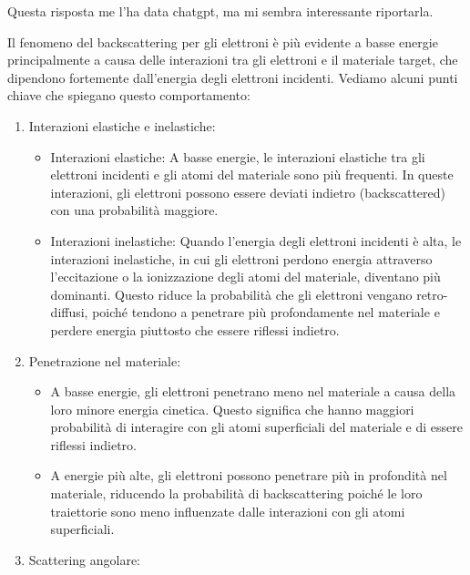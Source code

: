 \begin{approfondimento}
    \footnotesize Questa risposta me l'ha data chatgpt, ma mi sembra interessante riportarla.

    \vspace{0.2cm}Il fenomeno del backscattering per gli elettroni è più evidente a basse energie principalmente a causa delle interazioni tra gli elettroni e il materiale target, che dipendono fortemente dall'energia degli elettroni incidenti. Vediamo alcuni punti chiave che spiegano questo comportamento:

    \begin{enumerate}[leftmargin=0.6cm]
        \item Interazioni elastiche e inelastiche:
        \begin{itemize}[leftmargin=0pt]
            \item Interazioni elastiche: A basse energie, le interazioni elastiche tra gli elettroni incidenti e gli atomi del materiale sono più frequenti. In queste interazioni, gli elettroni possono essere deviati indietro (backscattered) con una probabilità maggiore.
            \item Interazioni inelastiche: Quando l'energia degli elettroni incidenti è alta, le interazioni inelastiche, in cui gli elettroni perdono energia attraverso l'eccitazione o la ionizzazione degli atomi del materiale, diventano più dominanti. Questo riduce la probabilità che gli elettroni vengano retro-diffusi, poiché tendono a penetrare più profondamente nel materiale e perdere energia piuttosto che essere riflessi indietro.
        \end{itemize}
        \item Penetrazione nel materiale:
        \begin{itemize}[leftmargin=0pt]
            \item A basse energie, gli elettroni penetrano meno nel materiale a causa della loro minore energia cinetica. Questo significa che hanno maggiori probabilità di interagire con gli atomi superficiali del materiale e di essere riflessi indietro.
            \item A energie più alte, gli elettroni possono penetrare più in profondità nel materiale, riducendo la probabilità di backscattering poiché le loro traiettorie sono meno influenzate dalle interazioni con gli atomi superficiali.
        \end{itemize}
        \item Scattering angolare:

\end{enumerate}
\end{approfondimento}
